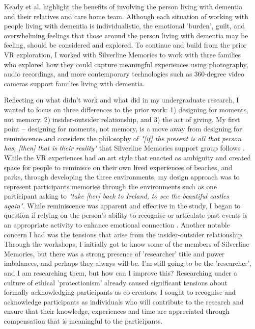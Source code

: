 Keady et al. highlight the benefits of involving the person living with dementia and their relatives and care home team. Although each situation of working with people living with dementia is individualistic, the emotional 'burden', guilt, and overwhelming feelings that those around the person living with dementia may be feeling, should be considered and explored. To continue and build from the prior VR exploration, I worked with Silverline Memories to work with three families who explored how they could capture meaningful experiences using photography, audio recordings, and more contemporary technologies such as 360-degree video cameras support families living with dementia.

Reflecting on what didn't work and what did in my undergraduate research, I wanted to focus on three differences to the prior work: 1) designing for moments, not memory, 2) insider-outsider relationship, and 3) the act of giving. My first point – designing for moments, not memory, is a move away from designing for reminiscence and considers the philosophy of \textit{"[if] the present is all that person has, [then] that is their reality"} that Silverline Memories support group follows \citep{hodge_exploring_2018}. While the VR experiences had an art style that enacted as ambiguity and created space for people to reminisce on their own lived experiences of beaches, and parks, through developing the three environments, my design approach was to represent participants memories through the environments such as one participant asking to \textit{"take [her] back to Ireland, to see the beautiful castles again"}. While reminiscence was apparent and effective in the study, I began to question if relying on the person's ability to recognise or articulate past events is an appropriate activity to enhance emotional connection \citep{lazar_systematic_2014}. Another notable concern I had was the tensions that arise from the insider-outsider relationship. Through the workshops, I initially got to know some of the members of Silverline Memories, but there was a strong presence of 'researcher' title and power imbalances, and perhaps they always will be. I'm still going to be the 'researcher', and I am researching them, but how can I improve this? Researching under a culture of ethical 'protectionism' already caused significant tensions about formally acknowledging participants as co-creators, I sought to recognise and acknowledge participants as individuals who will contribute to the research and ensure that their knowledge, experiences and time are appreciated through compensation that is meaningful to the participants.

